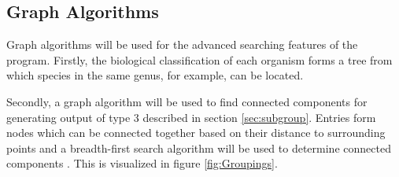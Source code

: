 \documentclass{article}
\begin{document}
\subsection{Graph Algorithms}\label{sec:graphalgs}
Graph algorithms will be used for the advanced searching features of the program. Firstly, the biological classification of each organism forms a tree from which species in the same genus, for example, can be located. 

Secondly, a graph algorithm will be used to find connected components for generating output of type 3 described in section \ref{sec:subgroup}. Entries form nodes which can be connected together based on their distance to surrounding points and a breadth-first search algorithm will be used to determine connected components \citep{broder2000graph}. This is visualized in figure \ref{fig:Groupings}.
\end{document}
